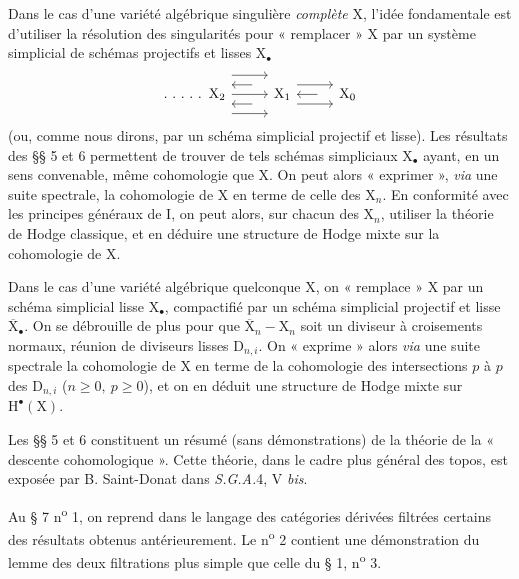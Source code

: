 \documentclass[11pt,leqno]{article}
\begin{document}
Dans le cas d’une variété algébrique singulière \textit{complète} \(\mathrm{X}\), l’idée fondamentale est d’utiliser la résolution des singularités pour « remplacer » \(\mathrm{X}\) par un système simplicial de schémas projectifs et lisses \(\mathrm{X}_{\bullet}\)
\[
\begin{tikzcd}[column sep=2.6em]
\ldotp\,\ldotp\,\ldotp\,\ldotp\,\ldotp\ \mathrm{X}_2
  \arrow[r, shift left=3.2ex]
  \arrow[r]
  \arrow[r, shift right=3.2ex]
&
\mathrm{X}_1
  \arrow[l, shift right=1.6ex, shorten <=1.1em]
  \arrow[l, shift left=1.6ex, shorten <=1.1em]
  \arrow[r, shift left=1.6ex]
  \arrow[r, shift right=1.6ex]
&
\mathrm{X}_0
  \arrow[l, shorten <=1.1em]
\end{tikzcd}
\]
(ou, comme nous dirons, par un schéma simplicial projectif et lisse). Les résultats des §§ 5 et 6 permettent de trouver de tels schémas simpliciaux \(\mathrm{X}_{\bullet}\) ayant, en un sens convenable, même cohomologie que \(\mathrm{X}\). On peut alors « exprimer », \textit{via} une suite spectrale, la cohomologie de \(\mathrm{X}\) en terme de celle des \(\mathrm{X}_n\). En conformité avec les principes généraux de I, on peut alors, sur chacun des \(\mathrm{X}_n\), utiliser la théorie de Hodge classique, et en déduire une structure de Hodge mixte sur la cohomologie de \(\mathrm{X}\).

Dans le cas d’une variété algébrique quelconque \(\mathrm{X}\), on « remplace » \(\mathrm{X}\) par un schéma simplicial lisse \(\mathrm{X}_{\bullet}\), compactifié par un schéma simplicial projectif et lisse \(\overline{\mathrm{X}}_{\bullet}\). On se débrouille de plus pour que \(\overline{\mathrm{X}}_n-\mathrm{X}_n\) soit un diviseur à croisements normaux, réunion de diviseurs lisses \(\mathrm{D}_{n,i}\). On « exprime » alors \textit{via} une suite spectrale la cohomologie de \(\mathrm{X}\) en terme de la cohomologie des intersections \(p\) à \(p\) des \(\mathrm{D}_{n,i}\) (\(n\geq 0,\ p\geq 0\)), et on en déduit une structure de Hodge mixte sur \(\mathrm{H}^{\bullet}(\mathrm{X})\).

Les §§ 5 et 6 constituent un résumé (sans démonstrations) de la théorie de la « descente cohomologique ». Cette théorie, dans le cadre plus général des topos, est exposée par B. Saint-Donat dans \textit{S.G.A.}4, V \textit{bis}.

Au § 7 n\textsuperscript{o} 1, on reprend dans le langage des catégories dérivées filtrées certains des résultats obtenus antérieurement. Le n\textsuperscript{o} 2 contient une démonstration du lemme des deux filtrations plus simple que celle du § 1, n\textsuperscript{o} 3.
\end{document}
